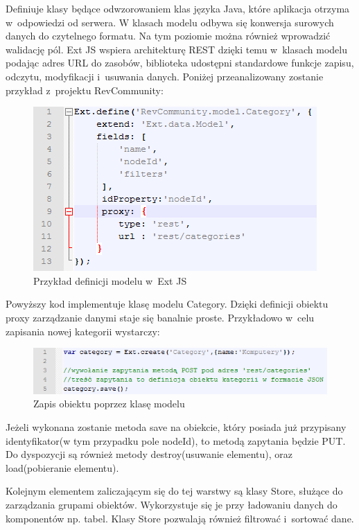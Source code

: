 Definiuje klasy będące odwzorowaniem klas języka Java, które aplikacja otrzyma w~odpowiedzi od serwera. W klasach modelu odbywa się konwersja surowych danych do czytelnego formatu. Na tym poziomie można również wprowadzić walidację pól. Ext JS wspiera architekturę REST dzięki temu w~klasach modelu podając adres URL do zasobów, biblioteka udostępni standardowe funkcje zapisu, odczytu, modyfikacji i~usuwania danych. Poniżej przeanalizowany zostanie przykład z~projektu RevCommunity:

\begin{figure}[H]
	\centering
	\includegraphics{images/ext_model.png}
	\caption{Przykład definicji modelu w~Ext JS}
\end{figure}

Powyższy kod implementuje klasę modelu Category. Dzięki definicji obiektu proxy zarządzanie danymi staje się banalnie proste. Przykładowo w~celu zapisania nowej kategorii wystarczy:

\begin{figure}[H]
	\centering
	\includegraphics{images/save_model.png}
	\caption{Zapis obiektu poprzez klasę modelu}
\end{figure}

Jeżeli wykonana zostanie metoda save na obiekcie, który posiada już przypisany identyfikator(w tym przypadku pole nodeId), to metodą zapytania będzie PUT.
Do dyspozycji są również metody destroy(usuwanie elementu), oraz load(pobieranie elementu).

Kolejnym elementem zaliczającym się do tej warstwy są klasy Store, służące do zarządzania grupami obiektów. Wykorzystuje się je przy ładowaniu danych do komponentów np. tabel. 
Klasy Store pozwalają również filtrować i~sortować dane.

